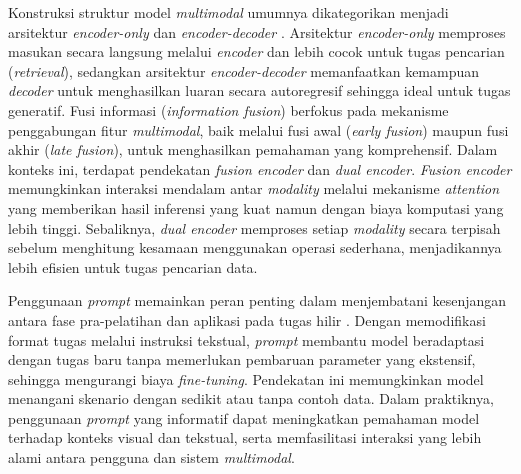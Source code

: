Konstruksi struktur model \textit{multimodal} umumnya dikategorikan menjadi arsitektur \textit{encoder-only} dan \textit{encoder-decoder} \parencite{wuMultimodalLargeLanguage2023}. Arsitektur \textit{encoder-only} memproses masukan secara langsung melalui \textit{encoder} dan lebih cocok untuk tugas pencarian (\textit{retrieval}), sedangkan arsitektur \textit{encoder-decoder} memanfaatkan kemampuan \textit{decoder} untuk menghasilkan luaran secara autoregresif sehingga ideal untuk tugas generatif. Fusi informasi (\textit{information fusion}) berfokus pada mekanisme penggabungan fitur \textit{multimodal}, baik melalui fusi awal (\textit{early fusion}) maupun fusi akhir (\textit{late fusion}), untuk menghasilkan pemahaman yang komprehensif. Dalam konteks ini, terdapat pendekatan \textit{fusion encoder} dan \textit{dual encoder}. \textit{Fusion encoder} memungkinkan interaksi mendalam antar \textit{modality} melalui mekanisme \textit{attention} yang memberikan hasil inferensi yang kuat namun dengan biaya komputasi yang lebih tinggi. Sebaliknya, \textit{dual encoder} memproses setiap \textit{modality} secara terpisah sebelum menghitung kesamaan menggunakan operasi sederhana, menjadikannya lebih efisien untuk tugas pencarian data.

Penggunaan \textit{prompt} memainkan peran penting dalam menjembatani kesenjangan antara fase pra-pelatihan dan aplikasi pada tugas hilir \parencite{wuMultimodalLargeLanguage2023}. Dengan memodifikasi format tugas melalui instruksi tekstual, \textit{prompt} membantu model beradaptasi dengan tugas baru tanpa memerlukan pembaruan parameter yang ekstensif, sehingga mengurangi biaya \textit{fine-tuning}. Pendekatan ini memungkinkan model menangani skenario dengan sedikit atau tanpa contoh data. Dalam praktiknya, penggunaan \textit{prompt} yang informatif dapat meningkatkan pemahaman model terhadap konteks visual dan tekstual, serta memfasilitasi interaksi yang lebih alami antara pengguna dan sistem \textit{multimodal}. 

